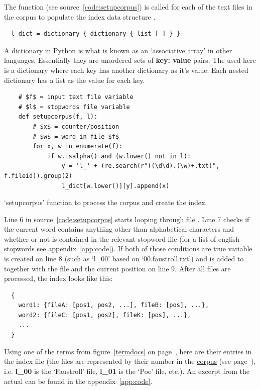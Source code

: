 The  function (see source~\ref{code:setupcorpus}) is called for each of the text files in the corpus to populate the index data structure .

\begin{verbatim}
  l_dict = dictionary { dictionary { list [ ] } }
\end{verbatim}

A dictionary in Python is what is known as an `associative array' in other languages. Essentially they are unordered sets of \textbf{key: value} pairs. The  used here is a dictionary where each key has another dictionary as it's value. Each nested dictionary has a list as the value for each key.

\begin{listing}
  \begin{verbatim}
    # $f$ = input text file variable
    # $l$ = stopwords file variable
    def setupcorpus(f, l):
        # $x$ = counter/position
        # $w$ = word in file $f$
        for x, w in enumerate(f):
            if w.isalpha() and (w.lower() not in l):
                y = 'l_' + (re.search(r"((\d\d).(\w)+.txt)", f.fileid)).group(2)
                l_dict[w.lower()][y].append(x)
  \end{verbatim}
\caption{`setupcorpus' function to process the corpus and create the index.}
\label{code:setupcorpus}
\end{listing}

Line 6 in source~\ref{code:setupcorpus} starts looping through file . Line 7 checks if the current word  contains anything other than alphabetical characters and whether or not  is contained in the relevant stopword file  (for a list of english stopwords see appendix~\ref{app:code}). If both of those conditions are true variable  is created on line 8 (such as `l\_00' based on `00.faustroll.txt') and  is added to  together with the file  and the current position  on line 9. After all files are processed, the index looks like this:

\begin{verbatim}
  {
    word1: {fileA: [pos1, pos2, ...], fileB: [pos], ...},
    word2: {fileC: [pos1, pos2], fileK: [pos], ...},
    ...
  }
\end{verbatim}

Using one of the terms from figure~\ref{termdocs} on page~\pageref{termdocs}, here are their entries in the index file (the files are represented by their number in the \hyperlink{corpus}{corpus} (see page~\pageref{ref:corpus}), i.e. \textbf{l\_00} is the `Faustroll' file, \textbf{l\_01} is the `Poe' file, etc.). An excerpt from the actual  can be found in the appendix~\ref{app:code}.

